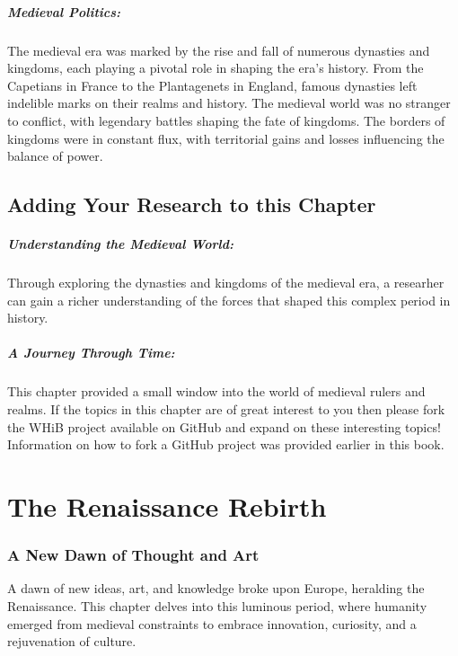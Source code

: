 \documentclass{book}
\begin{document}
\paragraph{Medieval Politics:}
The medieval era was marked by the rise and fall of numerous dynasties and kingdoms, each playing a pivotal role in shaping the era's history. From the Capetians in France to the Plantagenets in England, famous dynasties left indelible marks on their realms and history. The medieval world was no stranger to conflict, with legendary battles shaping the fate of kingdoms. The borders of kingdoms were in constant flux, with territorial gains and losses influencing the balance of power. 

\section*{Adding Your Research to this Chapter}

\paragraph{Understanding the Medieval World:}
Through exploring the dynasties and kingdoms of the medieval era, a researher can gain a richer understanding of the forces that shaped this complex period in history.

\paragraph{A Journey Through Time:}
This chapter provided a small window into the world of medieval rulers and realms. If the topics in this chapter are of great interest to you then please fork the WHiB project available on GitHub and expand on these interesting topics! Information on how to fork a GitHub project was provided earlier in this book.

\chapter{The Renaissance Rebirth}
\subsection*{A New Dawn of Thought and Art}
A dawn of new ideas, art, and knowledge broke upon Europe, heralding the Renaissance. This chapter delves into this luminous period, where humanity emerged from medieval constraints to embrace innovation, curiosity, and a rejuvenation of culture.
\end{document}

